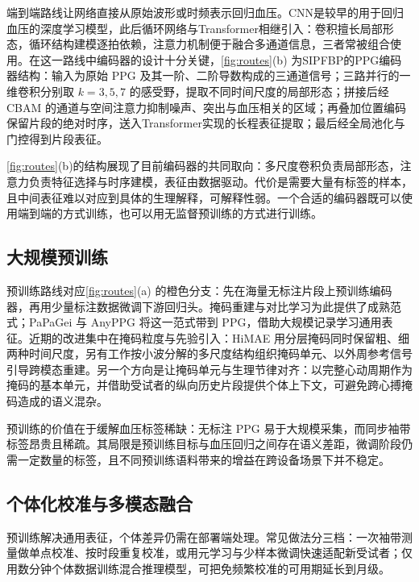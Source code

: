端到端路线让网络直接从原始波形或时频表示回归血压。CNN是较早的用于回归血压的深度学习模型\cite{liu2019cuffless}，此后循环网络与Transformer相继引入：卷积擅长局部形态，循环结构建模逐拍依赖，注意力机制便于融合多通道信息，三者常被组合使用。在这一路线中编码器的设计十分关键，\cref{fig:routes}(b) 为SIPFBP的PPG编码器结构：输入为原始 PPG 及其一阶、二阶导数构成的三通道信号；三路并行的一维卷积分别取 $k=3,5,7$ 的感受野，提取不同时间尺度的局部形态；拼接后经 CBAM 的通道与空间注意力抑制噪声、突出与血压相关的区域；再叠加位置编码保留片段的绝对时序，送入Transformer实现的长程表征提取；最后经全局池化与门控得到片段表征。

\cref{fig:routes}(b)的结构展现了目前编码器的共同取向：多尺度卷积负责局部形态，注意力负责特征选择与时序建模，表征由数据驱动。代价是需要大量有标签的样本，且中间表征难以对应到具体的生理解释，可解释性弱。一个合适的编码器既可以使用端到端的方式训练，也可以用无监督预训练的方式进行训练。

\subsection{大规模预训练}
\label{sec:pretrain}

预训练路线对应\cref{fig:routes}(a) 的橙色分支：先在海量无标注片段上预训练编码器，再用少量标注数据微调下游回归头。掩码重建与对比学习为此提供了成熟范式\cite{he2022mae,chen2020simclr}；PaPaGei 与 AnyPPG 将这一范式带到 PPG，借助大规模记录学习通用表征\cite{pillai2025papagei,nie2025anyppg}。近期的改进集中在掩码粒度与先验引入：HiMAE 用分层掩码同时保留粗、细两种时间尺度\cite{lee2026himae}，另有工作按小波分解的多尺度结构组织掩码单元、以外周参考信号引导跨模态重建\cite{thukral2026wavelet,zhou2026physiology}。另一个方向是让掩码单元与生理节律对齐：以完整心动周期作为掩码的基本单元，并借助受试者的纵向历史片段提供个体上下文，可避免跨心搏掩码造成的语义混杂。

预训练的价值在于缓解血压标签稀缺：无标注 PPG 易于大规模采集，而同步袖带标签昂贵且稀疏。其局限是预训练目标与血压回归之间存在语义差距，微调阶段仍需一定数量的标签，且不同预训练语料带来的增益在跨设备场景下并不稳定。

\subsection{个体化校准与多模态融合}
\label{sec:calib}

预训练解决通用表征，个体差异仍需在部署端处理。常见做法分三档：一次袖带测量做单点校准、按时段重复校准，或用元学习与少样本微调快速适配新受试者；仅用数分钟个体数据训练混合推理模型，可把免频繁校准的可用期延长到月级\cite{mekonnen2024accurate}。


